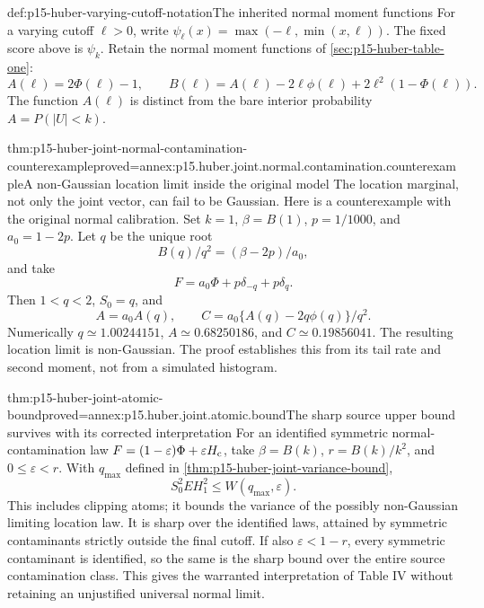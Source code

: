 \begin{hbdefinition}{def:p15-huber-varying-cutoff-notation}{The inherited normal moment functions}
For a varying cutoff \(\ell>0\), write
\(\psi_\ell(x)=\max(-\ell,\min(x,\ell))\).
The fixed score above is \(\psi_k\).
Retain the normal moment functions of \cref{sec:p15-huber-table-one}:
\[
 A(\ell)=2\Phi(\ell)-1,\qquad
 B(\ell)=A(\ell)-2\ell\phi(\ell)+2\ell^2(1-\Phi(\ell)).
\]
The function \(A(\ell)\) is distinct from the bare interior probability
\(A=P(|U|<k)\).
\end{hbdefinition}

\begin{hbtheorem}{thm:p15-huber-joint-normal-contamination-counterexample}{proved=annex:p15.huber.joint.normal.contamination.counterexample}{A non-Gaussian location limit inside the original model}
The location marginal, not only the joint vector, can fail to be
Gaussian. Here is a counterexample with the original normal calibration.
Set \(k=1\), \(\beta=B(1)\), \(p=1/1000\), and \(a_0=1-2p\).
Let \(q\) be the unique root
\[
              B(q)/q^2=(\beta-2p)/a_0,
\]
and take
\[
                F=a_0\Phi+p\delta_{-q}+p\delta_q .
\]
Then \(1<q<2\), \(S_0=q\), and
\[
 A=a_0 A(q),\qquad
 C=a_0\{A(q)-2q\phi(q)\}/q^2 .
\]
Numerically \(q\simeq1.00244151\), \(A\simeq0.68250186\),
and \(C\simeq0.19856041\).
The resulting location limit is non-Gaussian.
The proof establishes this from its tail rate and second moment,
not from a simulated histogram.
\end{hbtheorem}

\begin{hbtheorem}{thm:p15-huber-joint-atomic-bound}{proved=annex:p15.huber.joint.atomic.bound}{The sharp source upper bound survives with its corrected interpretation}
For an identified symmetric normal-contamination law
\(F=(1-\varepsilon)\Phi+\varepsilon H_{\rm c}\), take
\(\beta=B(k)\), \(r=B(k)/k^2\), and \(0\leq\varepsilon<r\).
With \(q_{\max}\) defined in
\cref{thm:p15-huber-joint-variance-bound},
\[
                  S_0^2 EH_1^2\leq W(q_{\max},\varepsilon).
\]
This includes clipping atoms; it bounds the variance of the
possibly non-Gaussian limiting location law.
It is sharp over the identified laws, attained by symmetric
contaminants strictly outside the final cutoff.
If also \(\varepsilon<1-r\), every symmetric contaminant is
identified, so the same is the sharp bound over the entire
source contamination class. This gives the warranted interpretation
of Table IV without retaining an unjustified universal normal limit.
\end{hbtheorem}


